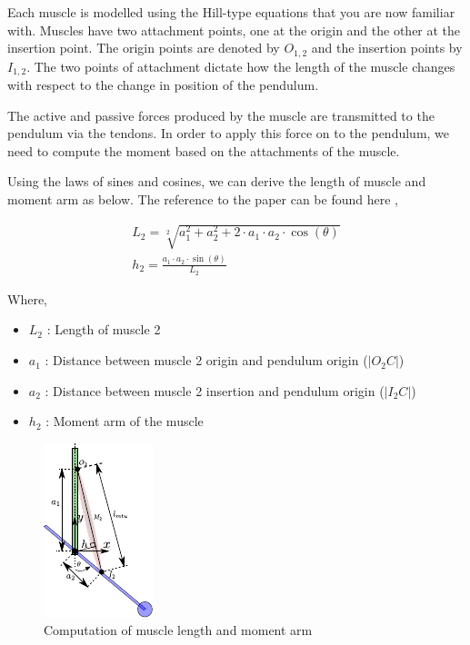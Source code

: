 \documentclass{cmc}
\begin{document}
Each muscle is modelled using the Hill-type equations that you are now
familiar with.  Muscles have two attachment points, one at the origin
and the other at the insertion point.  The origin points are denoted
by $O_{1,2}$ and the insertion points by $I_{1,2}$. The two points of
attachment dictate how the length of the muscle changes with respect
to the change in position of the pendulum.

The active and passive forces produced by the muscle are transmitted
to the pendulum via the tendons. In order to apply this force on to
the pendulum, we need to compute the moment based on the attachments
of the muscle.

Using the laws of sines and cosines, we can derive the length of
muscle and moment arm as below. The reference to the paper can be
found here
\href{https://www.ncbi.nlm.nih.gov/pmc/articles/PMC5323435}{},

\begin{eqnarray}
  \label{eq:2}
  L_2 = \sqrt[2]{a_{1}^2 + a_{2}^2 + 2 \cdot a_1 \cdot a_2 \cdot \cos(\theta)} \\
  h_2 = \frac{a_1 \cdot a_2 \cdot \sin(\theta)}{L_2}
\end{eqnarray}

Where,

\begin{itemize}
\item $L_2$ : Length of muscle 2
\item $a_1$ : Distance between muscle 2 origin and pendulum origin
  ($|O_2C|$)
\item $a_2$ : Distance between muscle 2 insertion and pendulum origin
  ($|I_2C|$)
\item $h_2$ : Moment arm of the muscle
\end{itemize}

\begin{figure}[H]
  \centering
  \includegraphics[scale=2.5]{figures/pendulum_moment_arm.pdf}
  \caption[force_length]{Computation of muscle length and moment arm}
  \label{fig:pendulum_muscles_force_length}
\end{figure}
\end{document}
